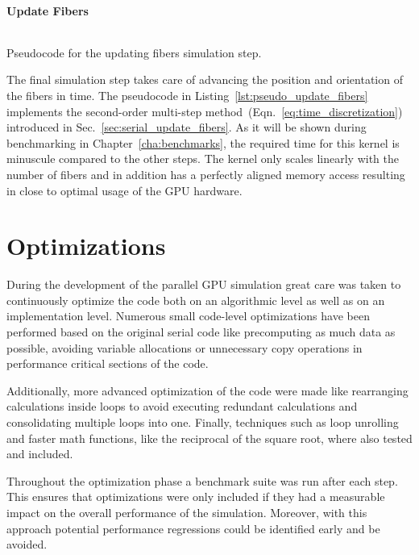 \paragraph{Update Fibers}

\begin{listing}[!htbp]
  \centering
  \inputminted[mathescape,
    linenos,
    numbersep=5pt,
    fontsize=\footnotesize,
    frame=lines,
    framesep=2mm]{c}{lst/update_fibers.lst}
  \caption{Pseudocode for the updating fibers simulation step.}
  \label{lst:pseudo_update_fibers}
\end{listing}

The final simulation step takes care of advancing the position and orientation of the fibers in time. The pseudocode in Listing~\ref{lst:pseudo_update_fibers} implements the second-order multi-step method~(Eqn.~\eqref{eq:time_discretization}) introduced in Sec.~\ref{sec:serial_update_fibers}. As it will be shown during benchmarking in Chapter~\ref{cha:benchmarks}, the required time for this kernel is minuscule compared to the other steps. The kernel only scales linearly with the number of fibers and in addition has a perfectly aligned memory access resulting in close to optimal usage of the GPU hardware.

\section{Optimizations}
\label{sec:parallel_optimizations}

During the development of the parallel GPU simulation great care was taken to continuously optimize the code both on an algorithmic level as well as on an implementation level. Numerous small code-level optimizations have been performed based on the original serial code like precomputing as much data as possible, avoiding variable allocations or unnecessary copy operations in performance critical sections of the code.

Additionally, more advanced optimization of the code were made like rearranging calculations inside loops to avoid executing redundant calculations and consolidating multiple loops into one. Finally, techniques such as loop unrolling and faster math functions, like the reciprocal of the square root, where also tested and included.

Throughout the optimization phase a benchmark suite was run after each step. This ensures that optimizations were only included if they had a measurable impact on the overall performance of the simulation. Moreover, with this approach potential performance regressions could be identified early and be avoided.

